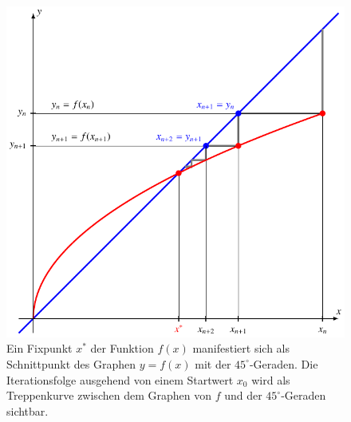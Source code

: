 \begin{beispiel}
\begin{figure}
\centering
\includegraphics{chapters/10-arithmetik/figures/iteration.pdf}
\caption{Ein Fixpunkt $x^*$ der Funktion $f(x)$ manifestiert sich als
Schnittpunkt des Graphen $y=f(x)$ mit der $45^\circ$-Geraden.
%
%
Die Iterationsfolge ausgehend von einem Startwert $x_0$ wird als
Treppenkurve zwischen dem Graphen von $f$ und der $45^\circ$-Geraden
sichtbar.
%
\label{buch:figure:iterationprinzip}}
\end{figure}


\end{beispiel}
